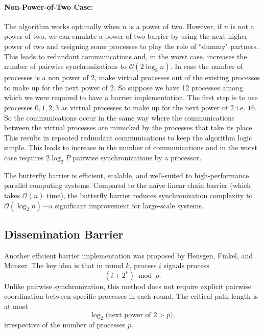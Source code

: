 \documentclass[12pt]{book}
\begin{document}
\paragraph{Non-Power-of-Two Case:}  
The algorithm works optimally when $n$ is a power of two. However, if $n$ is not a power of two, we can emulate a power-of-two barrier by using the next higher power of two and assigning some processes to play the role of ``dummy" partners. This leads to redundant communications and, in the worst case, increases the number of pairwise synchronizations to $\mathcal{O}(2\log_2 n)$. In case the number of processes is a non power of $2$, make virtual processes out of the existing processes to make up for the next power of $2$. So suppose we have 12 processes among which we were required to have a barrier implementation. The first step is to use processes $0,1,2,3$ as virtual processes to make up for the next power of $2$ i.e. $16$. So the communications occur in the same way where the communications between the virtual processes are mimicked by the processes that take its place. This results in repeated redundant communications to keep the algorithm logic simple. This leads to increase in the number of communications and in the worst case requires $2\log_2 P$ pairwise synchronizations by a processor.

The butterfly barrier is efficient, scalable, and well-suited to high-performance parallel computing systems. Compared to the naïve linear chain barrier (which takes $\mathcal{O}(n)$ time), the butterfly barrier reduces synchronization complexity to $\mathcal{O}(\log_2 n)$—a significant improvement for large-scale systems. 

\subsection*{Dissemination Barrier}
Another efficient barrier implementation was proposed by Hensgen, Finkel, and Manser. The key idea is that in round $k$, process $i$ signals process 
\[
(i + 2^k) \bmod p.
\]
Unlike pairwise synchronization, this method does not require explicit pairwise coordination between specific processes in each round. The critical path length is at most 
\[
\log_2\bigl(\text{next power of } 2 > p\bigr),
\]
irrespective of the number of processes $p$.
\end{document}
